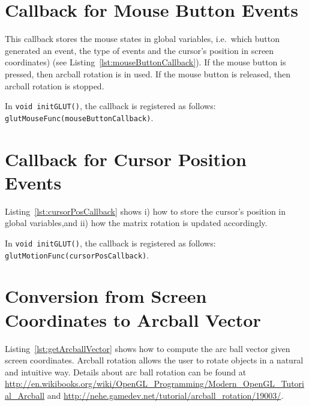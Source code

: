 \documentclass[11pt,oneside,a4paper,final]{article}
\begin{document}
\section{Callback for Mouse Button Events}
\label{mouseButtonCallback}

This callback stores the mouse states in global variables, i.e.~which button generated an event, the type of events and the cursor's position in screen coordinates) (see Listing~\ref{lst:mouseButtonCallback}).
If the mouse button is pressed, then arcball rotation is in used. 
If the mouse button is released, then arcball rotation is stopped.

In \verb+void initGLUT()+, the callback is registered as follows:
\verb+glutMouseFunc(mouseButtonCallback)+.

\begin{center}

\end{center}


\section{Callback for Cursor Position Events}
\label{cursorPosCallback}

Listing~\ref{lst:cursorPosCallback} shows i) how to store the cursor's position in global variables,and ii) 
how the matrix rotation is updated accordingly.

In \verb+void initGLUT()+, the callback is registered as follows:
\verb+glutMotionFunc(cursorPosCallback)+.

\begin{center}

\end{center}


\section{Conversion from Screen Coordinates to Arcball Vector}
\label{getArcballVector}

   Listing~\ref{lst:getArcballVector} shows how to compute the arc ball vector given screen coordinates. 
   Arcball rotation allows the user to rotate objects in a natural and intuitive way. 
  Details about arc ball rotation can be found at \url{http://en.wikibooks.org/wiki/OpenGL_Programming/Modern_OpenGL_Tutorial_Arcball} and \url{http://nehe.gamedev.net/tutorial/arcball_rotation/19003/}. 
\end{document}
